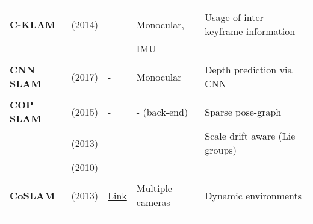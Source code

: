 \documentclass[a4paper,12pt]{scrartcl}
\begin{document}
{\begin{longtable}{l|l|l|l|l}
                           &                                   &                                                                    &                       &\\
    \textbf{C-KLAM}        & \cite{Nerurkar2014} (2014)        & -                                                                  & Monocular,            & Usage of inter-keyframe information\\
                           &                                   &                                                                    & IMU                   &\\
                           &                                   &                                                                    &                       &\\
    \textbf{CNN SLAM}      & \cite{Tateno2017} (2017)          & -                                                                  & Monocular             & Depth prediction via CNN\\
                           &                                   &                                                                    &                       &\\
    \textbf{COP SLAM}      & \cite{Dubbelman2015} (2015)       & -                                                                  & - (back-end)          & Sparse pose-graph\\
                           & \cite{Dubbelman2013} (2013)       &                                                                    &                       & Scale drift aware (Lie groups)\\
                           & \cite{Dubbelman2010} (2010)       &                                                                    &                       &\\
                           &                                   &                                                                    &                       &\\
    \textbf{CoSLAM}        & \cite{Zou2013} (2013)             & {\href{https://github.com/danping/CoSLAM}{Link}}                   & Multiple cameras      & Dynamic environments\\
                           &                                   &                                                                    &                       &\\
                           &                                   &                                                                    &                       &\\

\end{longtable}}
\end{document}
